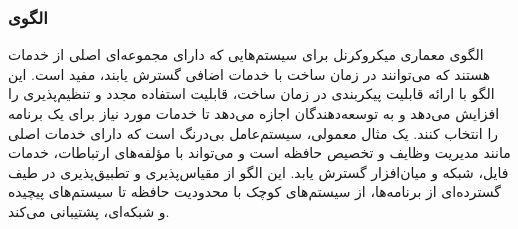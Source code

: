 \subsubsection{الگوی }
\label{archMicrokernelSec}
\begin{RTL}
الگوی معماری میکروکرنل \cite{ref4} برای سیستم‌هایی که دارای مجموعه‌ای اصلی
از خدمات هستند که می‌توانند در زمان ساخت با خدمات
اضافی گسترش یابند، مفید است.
این الگو با ارائه قابلیت پیکربندی در زمان ساخت،
قابلیت استفاده مجدد و تنظیم‌پذیری را افزایش می‌دهد و به توسعه‌دهندگان اجازه
می‌دهد تا خدمات مورد نیاز برای یک برنامه را انتخاب
کنند. یک مثال معمولی، سیستم‌عامل بی‌درنگ
است که دارای خدمات اصلی مانند مدیریت وظایف
و تخصیص حافظه است و می‌تواند با مؤلفه‌های ارتباطات،
خدمات فایل، شبکه و میان‌افزار گسترش یابد.
این الگو از مقیاس‌پذیری و تطبیق‌پذیری در
طیف گسترده‌ای از برنامه‌ها، از سیستم‌های کوچک با محدودیت
حافظه تا سیستم‌های پیچیده و شبکه‌ای، پشتیبانی می‌کند.
\end{RTL}